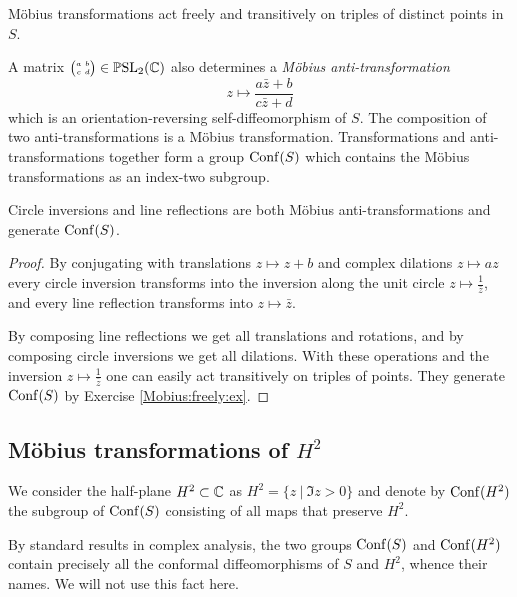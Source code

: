 \begin{ex} \label{Mobius:freely:ex}
M\"obius transformations act freely and transitively on triples of distinct points in $S$.
\end{ex}

A matrix $ \matr abcd\in \PSLC$ also determines a \emph{M\"obius anti-transformation}
$$z \mapsto \frac{a\bar z+b}{c\bar z+d}$$
which is an orientation-reversing self-diffeomorphism of $S$. The composition of two anti-transformations is a M\"obius transformation. Transformations and anti-transformations together form a group ${\rm Conf}(S)$ which contains the M\"obius transformations as an index-two subgroup.

\begin{prop}
Circle inversions and line reflections are both M\"obius anti-transformations and generate ${\rm Conf}(S)$.
\end{prop}
\begin{proof}
By conjugating with translations $z\mapsto z+b$ and complex dilations $z \mapsto az$ every circle inversion transforms into the inversion along the unit circle $z\mapsto \frac{1}{\bar z}$, and every line reflection transforms into $z\mapsto \bar z$.

By composing line reflections we get all translations and rotations, and by composing circle inversions we get all dilations. With these operations and the inversion $z\mapsto \frac 1 {\bar z}$ one can easily act transitively on triples of points. They generate ${\rm Conf}(S)$ by Exercise \ref{Mobius:freely:ex}.
\end{proof}

\subsection{M\"obius transformations of $H^2$}
We consider the half-plane $H^2\subset \mathbb{C}$ as $H^2 = \{z\ |\ \Im z >0\}$ and denote by ${\rm Conf}(H^2)$ the subgroup of ${\rm Conf}(S)$ consisting of all maps that preserve $H^2$.

\begin{rem}
By standard results in complex analysis, the two groups ${\rm Conf}(S)$ and ${\rm Conf}(H^2)$ contain precisely all the conformal diffeomorphisms of $S$ and $H^2$, whence their names. We will not use this fact here.
\end{rem}

